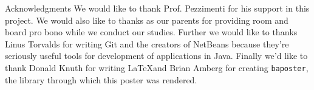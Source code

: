 \documentclass[landscape,fontscale=.4,paperwidth=48in,paperheight=36in]{baposter} %
\begin{document}
\begin{poster}
\begin{posterbox}[name=conclusion, column=44, below=padding, span=14]{Acknowledgments} 
We would like to thank Prof. Pezzimenti for his support in this project. We would also like to thanks as our parents for providing room and board pro bono while we conduct our studies. Further we would like to thanks Linus Torvalds for writing Git and the creators of NetBeans because they're seriously useful tools for development of applications in Java. Finally we'd like to thank Donald Knuth for writing \LaTeX and Brian Amberg for creating \verb|baposter|, the library through which this poster was rendered.
\end{posterbox}

\end{poster}
\end{document}
